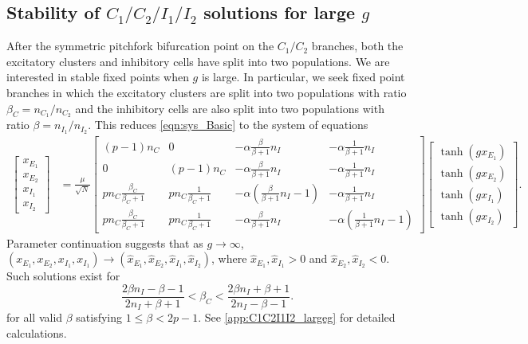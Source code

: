 \documentclass[reqno]{siamonline190516}
\begin{document}
\subsection{Stability of \texorpdfstring{$C_1/C_2/I_1/I_2$}{C1/C2/I1/I2} solutions for large \texorpdfstring{$g$}{g}}\label{sec:C1C2I1I2_largeg}

After the symmetric pitchfork bifurcation point on the $C_1/C_2$ branches, both the excitatory clusters and inhibitory cells have split into two populations. We are interested in stable fixed points when $g$ is large. In particular, we seek fixed point branches in which the excitatory clusters are split into two populations with ratio $\beta_C = n_{C_1}/n_{C_2}$ and the inhibitory cells are also split into two populations with ratio $\beta = n_{I_1}/n_{I_2}$. This reduces \cref{eqn:sys_Basic} to the system of equations
\begin{equation}\label{eq:cluster4system}
    \begin{aligned}
    \begin{bmatrix} x_{E_1} \\ x_{E_2} \\ x_{I_1} \\ x_{I_2} \end{bmatrix} 
    &= \frac{\mu}{\sqrt{N}} 
    \begin{bmatrix} 
       (p-1)n_C & 0 & -\alpha \frac{\beta}{\beta+1}n_I &  -\alpha \frac{1}{\beta+1}n_I \\
       0  & (p-1)n_C & -\alpha \frac{\beta}{\beta+1}n_I &  -\alpha \frac{1}{\beta+1}n_I \\
       p n_C \frac{\beta_C}{\beta_C+1} &
       p n_C \frac{1}{\beta_C+1} &
       -\alpha \left(\frac{\beta}{\beta+1}n_I-1\right) &  -\alpha \frac{1}{\beta+1}n_I \\
       p n_C \frac{\beta_C}{\beta_C+1} &
       p n_C \frac{1}{\beta_C+1} &
       -\alpha \frac{\beta}{\beta+1}n_I & -\alpha \left(\frac{1}{\beta+1}n_I - 1 \right)
    \end{bmatrix}
    \begin{bmatrix} \tanh(g x_{E_1}) \\ \tanh ( g x_{E_2} ) \\\tanh(g x_{I_1}) \\\tanh(g x_{I_2})  \end{bmatrix}.
    \end{aligned}
\end{equation}
Parameter continuation suggests that as $g \rightarrow \infty$, $(x_{E_1}, x_{E_2}, x_{I_1}, x_{I_1}) \rightarrow (\hat{x}_{E_1}, \hat{x}_{E_2}, \hat{x}_{I_1}, \hat{x}_{I_2})$, where $\hat{x}_{E_1}, \hat{x}_{I_1} > 0$ and $\hat{x}_{E_2}, \hat{x}_{I_2} < 0$. Such solutions exist for 
\begin{equation}\label{eq:bccondition}
    \frac{2 \beta n_I - \beta - 1}{2 n_I + \beta + 1} < \beta_C < \frac{2 \beta n_I + \beta + 1}{2 n_I - \beta - 1}.
\end{equation}
for all valid $\beta$ satisfying $1 \leq \beta < 2p-1$. See \cref{app:C1C2I1I2_largeg} for detailed calculations.
\end{document}
